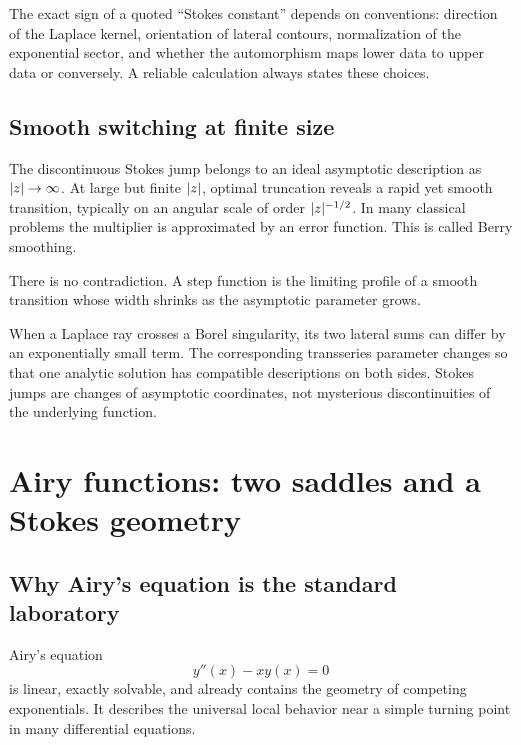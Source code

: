 \documentclass[11pt,oneside]{book}
\theoremstyle{definition}
\theoremstyle{remark}
\DeclarePairedDelimiter{\abs}{\lvert}{\rvert}
\begin{document}
The exact sign of a quoted ``Stokes constant'' depends on conventions: direction
of the Laplace kernel, orientation of lateral contours, normalization of the
exponential sector, and whether the automorphism maps lower data to upper data
or conversely. A reliable calculation always states these choices.

\section{Smooth switching at finite size}

The discontinuous Stokes jump belongs to an ideal asymptotic description as
$\abs z\to\infty$. At large but finite $\abs z$, optimal truncation reveals a
rapid yet smooth transition, typically on an angular scale of order
$\abs z^{-1/2}$. In many classical problems the multiplier is approximated by
an error function. This is called Berry smoothing.

There is no contradiction. A step function is the limiting profile of a smooth
transition whose width shrinks as the asymptotic parameter grows.

\begin{summarybox}
When a Laplace ray crosses a Borel singularity, its two lateral sums can differ
by an exponentially small term. The corresponding transseries parameter changes
so that one analytic solution has compatible descriptions on both sides. Stokes
jumps are changes of asymptotic coordinates, not mysterious discontinuities of
the underlying function.
\end{summarybox}


\chapter{Airy functions: two saddles and a Stokes geometry}
\label{ch:airy}

\section{Why Airy's equation is the standard laboratory}

Airy's equation
\begin{equation}
  y''(x)-x y(x)=0
  \label{eq:airy-equation}
\end{equation}
is linear, exactly solvable, and already contains the geometry of competing
exponentials. It describes the universal local behavior near a simple turning
point in many differential equations.
\end{document}
